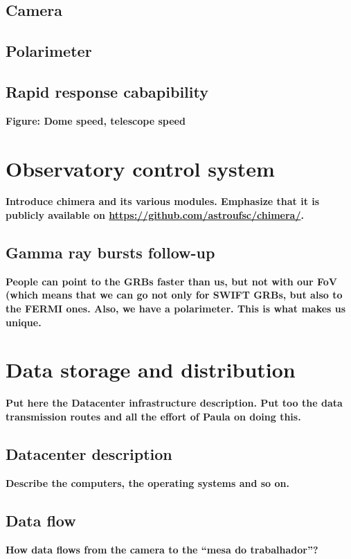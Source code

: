 \documentclass[12pt,preprint]{aastex}
\begin{document}
\subsection{Camera}

\subsection{Polarimeter}

\subsection{Rapid response cabapibility}
{\bf \color{red} Figure: Dome speed, telescope speed}

\section{Observatory control system}
{\bf \color{red} Introduce chimera and its various modules. Emphasize that it is publicly available on \url{https://github.com/astroufsc/chimera/}. }

\subsection{Gamma ray bursts follow-up}
{\bf \color{red} People can point to the GRBs faster than us, but not with our FoV (which means that we can go not only for SWIFT GRBs, but also to the FERMI ones. Also, we have a polarimeter. This is what makes us unique.}

\section{Data storage and distribution}
{\bf \color{red} Put here the Datacenter infrastructure description. Put too the data transmission routes and all the effort of Paula on doing this.}

\subsection{Datacenter description}
{\bf \color{red} Describe the computers, the operating systems and so on.}

\subsection{Data flow}
{\bf \color{red} How data flows from the camera to the ``mesa do trabalhador''?}
\end{document}
